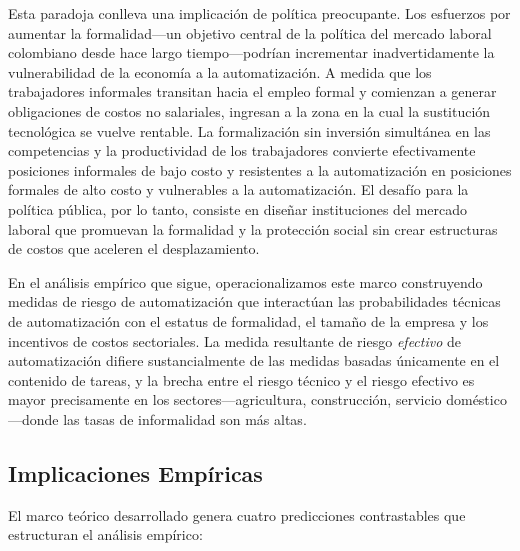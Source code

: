 \documentclass{article}
\begin{document}
Esta paradoja conlleva una implicaci\'on de pol\'itica preocupante. Los esfuerzos por aumentar la formalidad---un objetivo central de la pol\'itica del mercado laboral colombiano desde hace largo tiempo---podr\'ian incrementar inadvertidamente la vulnerabilidad de la econom\'ia a la automatizaci\'on. A medida que los trabajadores informales transitan hacia el empleo formal y comienzan a generar obligaciones de costos no salariales, ingresan a la zona en la cual la sustituci\'on tecnol\'ogica se vuelve rentable. La formalizaci\'on sin inversi\'on simult\'anea en las competencias y la productividad de los trabajadores convierte efectivamente posiciones informales de bajo costo y resistentes a la automatizaci\'on en posiciones formales de alto costo y vulnerables a la automatizaci\'on. El desaf\'io para la pol\'itica p\'ublica, por lo tanto, consiste en dise\~nar instituciones del mercado laboral que promuevan la formalidad y la protecci\'on social sin crear estructuras de costos que aceleren el desplazamiento.

En el an\'alisis emp\'irico que sigue, operacionalizamos este marco construyendo medidas de riesgo de automatizaci\'on que interact\'uan las probabilidades t\'ecnicas de automatizaci\'on con el estatus de formalidad, el tama\~no de la empresa y los incentivos de costos sectoriales. La medida resultante de riesgo \textit{efectivo} de automatizaci\'on difiere sustancialmente de las medidas basadas \'unicamente en el contenido de tareas, y la brecha entre el riesgo t\'ecnico y el riesgo efectivo es mayor precisamente en los sectores---agricultura, construcci\'on, servicio dom\'estico---donde las tasas de informalidad son m\'as altas.

\subsection{Implicaciones Emp\'iricas}
\label{subsec:empirical_implications}

El marco te\'orico desarrollado genera cuatro predicciones contrastables que estructuran el an\'alisis emp\'irico:
\end{document}
